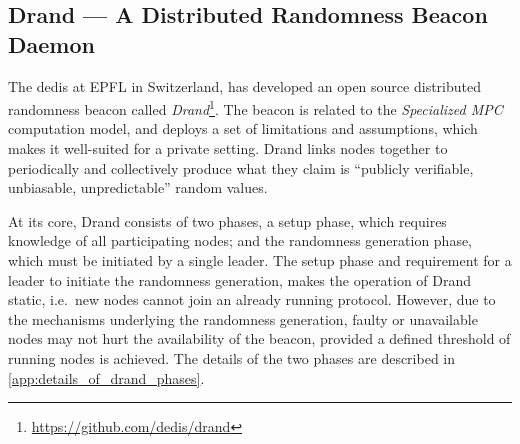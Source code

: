 \subsection{Drand --- A Distributed Randomness Beacon Daemon}%
\label{sub:drand_a_distributed_randomness_beacon_daemon}
The \gls{dedis} at EPFL in Switzerland, has developed an open source distributed randomness beacon called \textit{Drand}\footnote{\url{https://github.com/dedis/drand}}.
The beacon is related to the \textit{Specialized MPC} computation model, and deploys a set of limitations and assumptions, which makes it well-suited for a private setting.
Drand links nodes together to periodically and collectively produce what they claim is \enquote{publicly verifiable, unbiasable, unpredictable} random values.

At its core, Drand consists of two phases, a setup phase, which requires knowledge of all participating nodes; and the randomness generation phase, which must be initiated by a single leader.
The setup phase and requirement for a leader to initiate the randomness generation, makes the operation of Drand static, i.e.\ new nodes cannot join an already running protocol.
However, due to the mechanisms underlying the randomness generation, faulty or unavailable nodes may not hurt the availability of the beacon, provided a defined threshold of running nodes is achieved.
The details of the two phases are described in \vref{app:details_of_drand_phases}.

